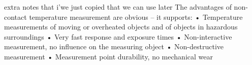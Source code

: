 extra notes that i'we just copied that we can use later 
The advantages of non-contact temperature measurement
are obvious – it supports:
• Temperature measurements of moving or overheated
objects and of objects in hazardous surroundings
• Very fast response and exposure times
• Non-interactive measurement, no influence on
the measuring object
• Non-destructive measurement
• Measurement point durability, no mechanical wear


